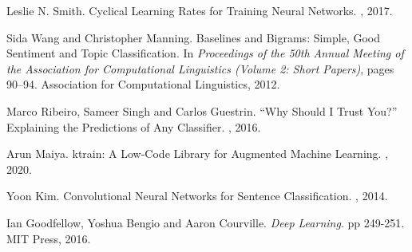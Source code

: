\documentclass[twocolumn,10pt]{wmrDoc}
\begin{document}
\begin{thebibliography}{1}
Leslie N. Smith.
\newblock Cyclical Learning Rates for Training Neural Networks.
, 2017.

Sida Wang and Christopher Manning.
\newblock Baselines and Bigrams: Simple, Good Sentiment and Topic Classification.
\newblock In {\em Proceedings of the 50th Annual Meeting of the Association for Computational Linguistics (Volume 2: Short Papers)}, pages 90--94. Association for Computational Linguistics, 2012.

Marco Ribeiro, Sameer Singh and Carlos Guestrin.
\newblock “Why Should I Trust You?” Explaining the Predictions of Any Classifier.
, 2016.

Arun Maiya.
\newblock ktrain: A Low-Code Library for Augmented Machine Learning.
, 2020.

Yoon Kim.
\newblock Convolutional Neural Networks for Sentence Classification.
, 2014.

Ian Goodfellow, Yoshua Bengio and Aaron Courville.
\newblock \emph{Deep Learning}.
\newblock pp 249-251. MIT Press, 2016.

\end{thebibliography}
\end{document}

